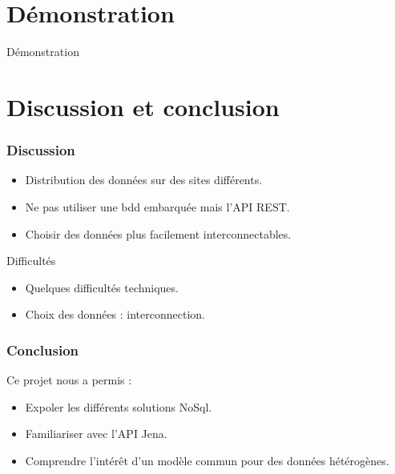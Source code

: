 \documentclass[12pt]{beamer}
\begin{document}
\section{Démonstration}

\begin{frame}

\begin{center}
\huge Démonstration

\end{center}
\end{frame}
\section{Discussion et conclusion}

\begin{frame}


\frametitle{Discussion}
\begin{itemize}
\item Distribution des données sur des sites différents.
\item Ne pas utiliser une bdd embarquée mais l'API REST.
\item Choisir des données plus facilement interconnectables.
\end{itemize}
\begin{block}{Difficultés}
\begin{itemize}
\item Quelques difficultés techniques.
\item Choix des données : interconnection.
\end{itemize}
\end{block}
\end{frame}
\begin{frame}


\frametitle{Conclusion}
Ce projet nous a permis :
\begin{itemize}
\item Expoler les différents solutions NoSql.
\item Familiariser avec l'API Jena.
\item Comprendre l'intérêt d'un modèle commun pour des données hétérogènes. 
\end{itemize}

\end{frame}
\end{document}
